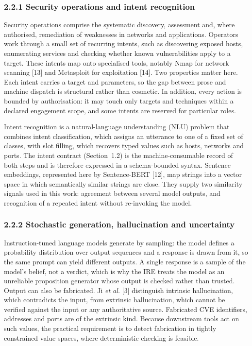 \documentclass[
]{article}
\begin{document}
\hypertarget{security-operations-and-intent-recognition}{%
\subsubsection{2.2.1 Security operations and intent
recognition}\label{security-operations-and-intent-recognition}}

Security operations comprise the systematic discovery, assessment and,
where authorised, remediation of weaknesses in networks and
applications. Operators work through a small set of recurring intents,
such as discovering exposed hosts, enumerating services and checking
whether known vulnerabilities apply to a target. These intents map onto
specialised tools, notably Nmap for network scanning {[}13{]} and
Metasploit for exploitation {[}14{]}. Two properties matter here. Each
intent carries a target and parameters, so the gap between prose and
machine dispatch is structural rather than cosmetic. In addition, every
action is bounded by authorisation: it may touch only targets and
techniques within a declared engagement scope, and some intents are
reserved for particular roles.

Intent recognition is a natural-language understanding (NLU) problem
that combines intent classification, which assigns an utterance to one
of a fixed set of classes, with slot filling, which recovers typed
values such as hosts, networks and ports. The intent contract
(Section~1.2) is the machine-consumable record of both steps and is
therefore expressed in a schema-bounded syntax. Sentence embeddings,
represented here by Sentence-BERT {[}12{]}, map strings into a vector
space in which semantically similar strings are close. They supply two
similarity signals used in this work: agreement between several model
outputs, and recognition of a repeated intent without re-invoking the
model.

\hypertarget{stochastic-generation-hallucination-and-uncertainty}{%
\subsubsection{2.2.2 Stochastic generation, hallucination and
uncertainty}\label{stochastic-generation-hallucination-and-uncertainty}}

Instruction-tuned language models generate by sampling: the model
defines a probability distribution over output sequences and a response
is drawn from it, so the same prompt can yield different outputs. A
single response is a sample of the model's belief, not a verdict, which
is why the IRE treats the model as an unreliable proposition generator
whose output is checked rather than trusted. Output can also be
fabricated. Ji \emph{et al.} {[}3{]} distinguish intrinsic
hallucination, which contradicts the input, from extrinsic
hallucination, which cannot be verified against the input or any
authoritative source. Fabricated CVE identifiers, addresses and ports
are of the extrinsic kind. Because downstream tools act on such values,
the practical requirement is to detect fabrication in tightly
constrained value spaces, where deterministic checking is feasible.
\end{document}
